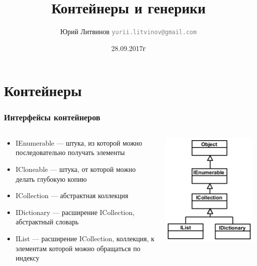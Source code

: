 \documentclass[xetex,mathserif,serif]{beamer}
\title{Контейнеры и генерики}
\author[Юрий Литвинов]{Юрий Литвинов \newline \textcolor{gray}{\small\texttt{yurii.litvinov@gmail.com}}}
\date{28.09.2017г}
\begin{document}
	\frame{\titlepage}

	\section{Контейнеры}

	\begin{frame}
		\frametitle{Интерфейсы контейнеров}
		\begin{columns}
			\begin{column}{0.65\textwidth}
				\begin{itemize}
					\item IEnumerable --- штука, из которой можно последовательно получать элементы
					\item ICloneable --- штука, от которой можно делать глубокую копию
					\item ICollection --- абстрактная коллекция
					\item IDictionary --- расширение ICollection, абстрактный словарь
					\item IList --- расширение ICollection, коллекция, к элементам которой можно обращаться по индексу
				\end{itemize}
			\end{column}
			\begin{column}{0.3\textwidth}
				\includegraphics[width=\textwidth]{interfaces.png}
			\end{column}
		\end{columns}
	\end{frame}
\end{document}
